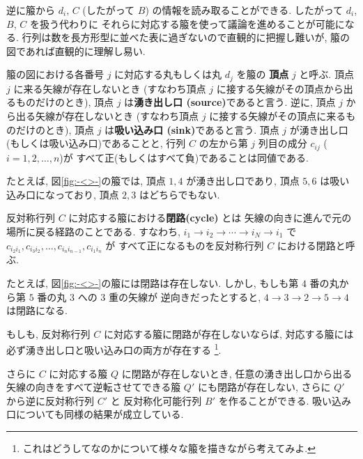 \documentclass[12pt,twoside,dvipdfm]{jarticle}
\theoremstyle{definition} %
\theoremstyle{definition} %
\theoremstyle{definition} %
\numberwithin{theorem}{section}
\numberwithin{equation}{section}
\numberwithin{figure}{section}
\numberwithin{table}{section}
\newcommand\figureref[1]{図\ref{#1}}
\newcommand\figref[1]{\figureref{#1}}
\begin{document}
逆に箙から $d_i$, $C$ (したがって $B$) の情報を読み取ることができる.
したがって $d_i$, $B$, $C$ を扱う代わりに
それらに対応する箙を使って議論を進めることが可能になる.
行列は数を長方形型に並べた表に過ぎないので直観的に把握し難いが, 
箙の図であれば直観的に理解し易い.

箙の図における各番号 $j$ に対応する丸もしくは丸 $d_j$ を箙の
{\bf 頂点} $j$ と呼ぶ.
頂点 $j$ に来る矢線が存在しないとき
(すなわち頂点 $j$ に接する矢線がその頂点から出るものだけのとき), 
頂点 $j$ は{\bf 湧き出し口 (source)}であると言う.
逆に, 頂点 $j$ から出る矢線が存在しないとき
(すなわち頂点 $j$ に接する矢線がその頂点に来るものだけのとき),
頂点 $j$ は{\bf 吸い込み口 (sink)}であると言う.
頂点 $j$ が湧き出し口(もしくは吸い込み口)であることと, 
行列 $C$ の左から第 $j$ 列目の成分 $c_{ij}$ ($i=1,2,\ldots,n$)が
すべて正(もしくはすべて負)であることは同値である.

たとえば, \figref{fig:-<>-}の箙では, 頂点 $1,4$ が湧き出し口であり, 
頂点 $5,6$ は吸い込み口になっており, 頂点 $2,3$ はどちらでもない.

反対称行列 $C$ に対応する箙における{\bf 閉路(cycle)} とは
矢線の向きに進んで元の場所に戻る経路のことである.
すなわち, $i_1\to i_2\to\cdots\to i_N\to i_1$ 
で $c_{i_2i_1},c_{i_3i_2},\ldots,c_{i_n i_{n-1}},c_{i_1i_n}$ が
すべて正になるものを反対称行列 $C$ における閉路と呼ぶ.

たとえば, \figref{fig:-<>-}の箙には閉路は存在しない.
しかし, もしも第 $4$ 番の丸から第 $5$ 番の丸 $3$ への $3$ 重の矢線が
逆向きだったとすると, $4\to 3\to 2\to 5\to 4$ は閉路になる.

もしも, 反対称行列 $C$ に対応する箙に閉路が存在しないならば, 
対応する箙には必ず湧き出し口と吸い込み口の両方が存在する%
\footnote{これはどうしてなのかについて様々な箙を描きながら考えてみよ.}. 

さらに $C$ に対応する箙 $Q$ に閉路が存在しないとき, 
任意の湧き出し口から出る矢線の向きをすべて逆転させてできる箙 $Q'$ 
にも閉路が存在しない, さらに $Q'$ から逆に反対称行列 $C'$ と
反対称化可能行列 $B'$ を作ることができる.
吸い込み口についても同様の結果が成立している.
\end{document}
